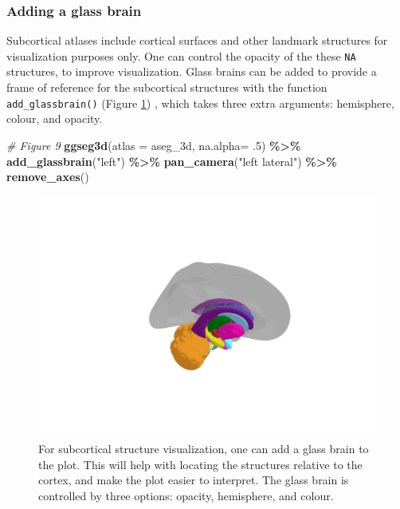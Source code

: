 \documentclass[fleqn,10pt]{wlpeerj} %
\newenvironment{Shaded}{\begin{snugshade}}{\end{snugshade}}
\newcommand{\CommentTok}[1]{\textcolor[rgb]{0.56,0.35,0.01}{\textit{#1}}}
\newcommand{\DataTypeTok}[1]{\textcolor[rgb]{0.13,0.29,0.53}{#1}}
\newcommand{\FloatTok}[1]{\textcolor[rgb]{0.00,0.00,0.81}{#1}}
\newcommand{\KeywordTok}[1]{\textcolor[rgb]{0.13,0.29,0.53}{\textbf{#1}}}
\newcommand{\NormalTok}[1]{#1}
\newcommand{\OperatorTok}[1]{\textcolor[rgb]{0.81,0.36,0.00}{\textbf{#1}}}
\newcommand{\StringTok}[1]{\textcolor[rgb]{0.31,0.60,0.02}{#1}}
\begin{document}
\hypertarget{adding-a-glass-brain}{%
\subsubsection{Adding a glass brain}\label{adding-a-glass-brain}}

Subcortical atlases include cortical surfaces and other landmark structures for visualization purposes only.
One can control the opacity of the these \texttt{NA} structures, to improve visualization.
Glass brains can be added to provide a frame of reference for the subcortical structures with the function \texttt{add\_glassbrain()} (Figure \ref{fig:glassbrain1}) , which takes three extra arguments: hemisphere, colour, and opacity.

\begin{Shaded}
\begin{Highlighting}[]
\CommentTok{\# Figure 9}
\KeywordTok{ggseg3d}\NormalTok{(}\DataTypeTok{atlas =}\NormalTok{ aseg\_3d,}
        \DataTypeTok{na.alpha=} \FloatTok{.5}\NormalTok{) }\OperatorTok{\%>\%}\StringTok{   }
\StringTok{  }\KeywordTok{add\_glassbrain}\NormalTok{(}\StringTok{"left"}\NormalTok{) }\OperatorTok{\%>\%}\StringTok{ }
\StringTok{  }\KeywordTok{pan\_camera}\NormalTok{(}\StringTok{"left lateral"}\NormalTok{) }\OperatorTok{\%>\%}\StringTok{ }
\StringTok{  }\KeywordTok{remove\_axes}\NormalTok{()}
\end{Highlighting}
\end{Shaded}



\begin{figure}[H]
\includegraphics[width=0.6\linewidth]{png/ggseg3d_glass} \caption{For subcortical structure visualization, one can add a glass brain to the plot. This will help with locating the structures relative to the cortex, and make the plot easier to interpret. The glass brain is controlled by three options: opacity, hemisphere, and colour.}\label{fig:glassbrain1}
\end{figure}
\end{document}
